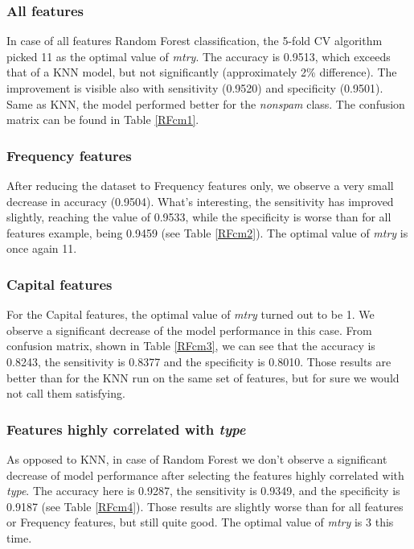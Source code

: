 \documentclass{article}\usepackage[]{graphicx}\usepackage[]{xcolor}
\begin{document}
\subsubsection*{All features}

In case of all features Random Forest classification, the 5-fold CV algorithm picked 
11 as the optimal value of \textit{mtry}. The accuracy is 0.9513, which exceeds that 
of a KNN model, but not significantly (approximately 2\% difference).
The improvement is visible also with sensitivity (0.9520) and specificity (0.9501).
Same as KNN, the model performed better for the \textit{nonspam} class.
The confusion matrix can be found in Table \ref{RFcm1}.

\subsubsection*{Frequency features}

After reducing the dataset to Frequency features only, we observe a very small decrease
in accuracy (0.9504). What's interesting, the sensitivity has improved slightly,
reaching the value of 0.9533, while the specificity is worse than for all features example,
being 0.9459 (see Table \ref{RFcm2}). The optimal value of \textit{mtry} is once again 11.

\subsubsection*{Capital features}

For the Capital features, the optimal value of \textit{mtry} turned out to be 1.
We observe a significant decrease of the model performance in this case. 
From confusion matrix, shown in Table \ref{RFcm3}, we can see that the accuracy
is 0.8243, the sensitivity is 0.8377 and the specificity is 0.8010. Those results 
are better than for the KNN run on the same set of features, but for sure we would 
not call them satisfying.

\subsubsection*{Features highly correlated with \textit{type}}

As opposed to KNN, in case of Random Forest we don't observe a significant decrease
of model performance after selecting the features highly correlated with \textit{type}.
The accuracy here is 0.9287, the sensitivity is 0.9349, and the specificity is 0.9187 (see Table \ref{RFcm4}).
Those results are slightly worse than for all features or Frequency features, but
still quite good. The optimal value of \textit{mtry} is 3 this time.
\end{document}
